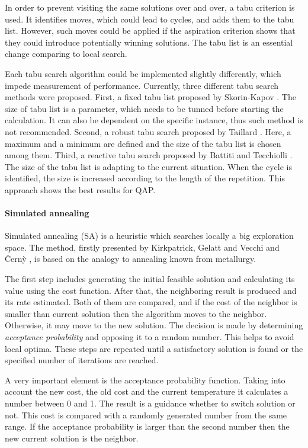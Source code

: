 In order to prevent visiting the same solutions over and over, a tabu criterion is used.
It identifies moves, which could lead to cycles, and adds them to the tabu list.
However, such moves could be applied if the aspiration criterion shows that they could introduce potentially winning solutions.
The tabu list is an essential change comparing to local search.

Each tabu search algorithm could be implemented slightly differently, which impede measurement of performance.
Currently, three different tabu search methods were proposed.
First, a fixed tabu list proposed by Skorin-Kapov \cite{skorin1990tabu}.
The size of tabu list is a parameter, which needs to be tunned before starting the calculation.
It can also be dependent on the specific instance, thus such method is not recommended.
Second, a robust tabu search proposed by Taillard \cite{taillard1991robust}.
Here, a maximum and a minimum are defined and the size of the tabu list is chosen among them.
Third, a reactive tabu search proposed by Battiti and Tecchiolli \cite{battiti1994reactive}.
The size of the tabu list is adapting to the current situation.
When the cycle is identified, the size is increased according to the length of the repetition.
This approach shows the best results for QAP.

\paragraph{Simulated annealing}

Simulated annealing (SA) is a heuristic which searches locally a big exploration space.
The method, firstly presented by Kirkpatrick, Gelatt and Vecchi \cite{kirkpatrick1983optimization} and {\v{C}}ern{\`y} \cite{vcerny1985thermodynamical}, is based on the analogy to annealing known from metallurgy.

The first step includes generating the initial feasible solution and calculating its value using the cost function.
After that, the neighboring result is produced and its rate estimated.
Both of them are compared, and if the cost of the neighbor is smaller than current solution then the algorithm moves to the neighbor.
Otherwise, it may move to the new solution.
The decision is made by determining \textit{acceptance probability} and opposing it to a random number.
This helps to avoid local optima.
These steps are repeated until a satisfactory solution is found or the specified number of iterations are reached.

A very important element is the acceptance probability function.
Taking into account the new cost, the old cost and the current temperature it calculates a number between 0 and 1.
The result is a guidance whether to switch solution or not.
This cost is compared with a randomly generated number from the same range.
If the acceptance probability is larger than the second number then the new current solution is the neighbor.

